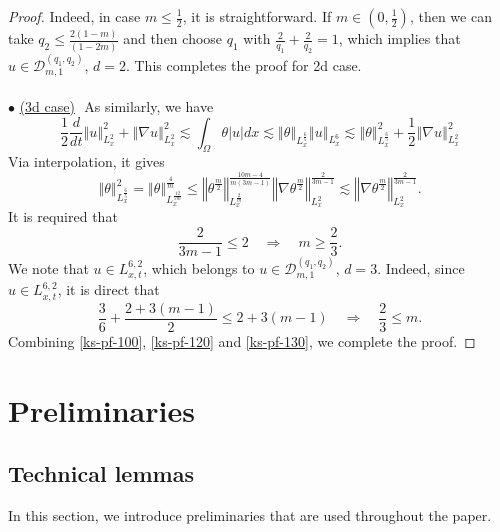 \documentclass{amsart}
\numberwithin{equation}{section}
\newcommand{\norm}[1]{\left\Vert #1 \right\Vert}
\newcommand{\abs}[1]{\left| #1 \right|}
\begin{document}
\begin{proof}
Indeed, in case $m\le \frac{1}{2}$, it is straightforward. If $m \in (0, \frac{1}{2})$, then we can take $q_2 \le \frac{2(1-m)}{(1-2m)}$ and then choose $q_1$ with $\frac{2}{q_1}+\frac{2}{q_2}=1$, which implies that $u\in\mathcal{D}_{m,1}^{(q_1, q_2)}$, $d=2$.
This completes the proof for 2d case.
\\
\\
$\bullet$ \underline{(3d case)}\,\, 
As similarly, we have 
\begin{equation}\label{ks-pf-120}
\frac{1}{2}\frac{d}{dt}\norm{u}_{L^{2}_{x}}^2+\norm{\nabla u}_{L^{2}_{x}}^2\lesssim \int_{\Omega}\theta \abs{u}dx\lesssim \norm{\theta}_{L^{\frac{6}{5}}_{x}}\norm{u}_{L^{6}_{x}} \lesssim \norm{\theta}^{2}_{L^{\frac{6}{5}}_{x}} +\frac{1}{2}\norm{\nabla u}^2_{L^{2}_{x}}
\end{equation}
Via interpolation, it gives
\begin{equation}\label{ks-pf-130}
\norm{\theta}^{2}_{L^{\frac{6}{5}}_{x}}=\norm{\theta}^{\frac{4}{m}}_{L^{\frac{12}{5m}}_{x}}\le \norm{\theta^{\frac{m}{2}}}^{\frac{10m-4}{m(3m-1)}}_{L^{\frac{2}{m}}_{x}}\norm{\nabla \theta^{\frac{m}{2}}}^{\frac{2}{3m-1}}_{L^{2}_{x}}\lesssim \norm{\nabla \theta^{\frac{m}{2}}}^{\frac{2}{3m-1}}_{L^{2}_{x}}.
\end{equation}
It is required that
\[
\frac{2}{3m-1}\le 2 \quad \Longrightarrow \quad  m \geq \frac{2}{3}.
\]
We note that $u\in L^{6,2}_{x,t}$, which belongs to $u\in\mathcal{D}_{m,1}^{(q_1, q_2)}$, $d=3$. Indeed, since $u\in L^{6,2}_{x,t}$, it is direct that 
\[
\frac{3}{6} + \frac{2+3(m-1)}{2} \leq 2+ 3(m-1)\quad\Longrightarrow\quad \frac{2}{3}\leq m.
\]
Combining \eqref{ks-pf-100}, \eqref{ks-pf-120} and \eqref{ks-pf-130}, we complete the proof.
\end{proof}





\section{Preliminaries}\label{SS:Preliminaries} 

\subsection{Technical lemmas}

In this section, we introduce preliminaries that are used throughout the paper.
\end{document}
